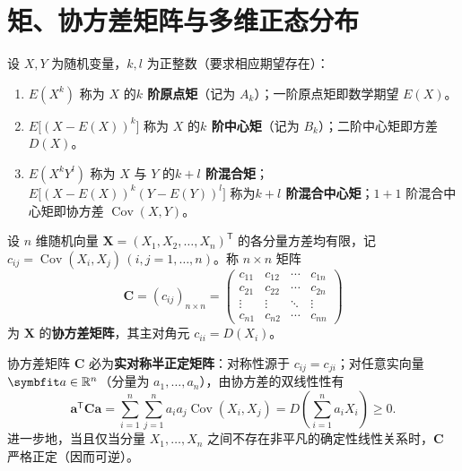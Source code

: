 \section{矩、协方差矩阵与多维正态分布}
\label{sec:moments}

\begin{definition}
\label{def:moments}
设 $X,Y$ 为随机变量，$k,l$ 为正整数（要求相应期望存在）：
\begin{enumerate}
  \item $E(X^k)$ 称为 $X$ 的\textbf{$k$ 阶原点矩}（记为 $A_k$）；一阶原点矩即数学期望 $E(X)$。
  \item $E\bigl[(X-E(X))^k\bigr]$ 称为 $X$ 的\textbf{$k$ 阶中心矩}（记为 $B_k$）；二阶中心矩即方差 $D(X)$。
  \item $E(X^k Y^l)$ 称为 $X$ 与 $Y$ 的\textbf{$k+l$ 阶混合矩}；$E\bigl[(X-E(X))^k(Y-E(Y))^l\bigr]$ 称为\textbf{$k+l$ 阶混合中心矩}；$1+1$ 阶混合中心矩即协方差 $\operatorname{Cov}(X,Y)$。
\end{enumerate}
\end{definition}

\begin{definition}[协方差矩阵]
\label{def:covariance-matrix}
设 $n$ 维随机向量 $\bm{X}=(X_1,X_2,\ldots,X_n)^{\mathsf{T}}$ 的各分量方差均有限，记 $c_{ij}=\operatorname{Cov}(X_i,X_j)\,(i,j=1,\ldots,n)$。称 $n\times n$ 矩阵
\begin{equation}
  \bm{C}=(c_{ij})_{n\times n}=
  \begin{pmatrix}
    c_{11} & c_{12} & \cdots & c_{1n} \\
    c_{21} & c_{22} & \cdots & c_{2n} \\
    \vdots & \vdots & \ddots & \vdots \\
    c_{n1} & c_{n2} & \cdots & c_{nn}
  \end{pmatrix}
  \label{eq:cov-matrix}
\end{equation}
为 $\bm{X}$ 的\textbf{协方差矩阵}，其主对角元 $c_{ii}=D(X_i)$。
\end{definition}

协方差矩阵 $\bm{C}$ 必为\textbf{实对称半正定矩阵}：对称性源于 $c_{ij}=c_{ji}$；对任意实向量 $\bm{a}\in\R^n$（分量为 $a_1,\ldots,a_n$），由协方差的双线性性有
\[
  \bm{a}^{\mathsf{T}}\bm{C}\bm{a}
  =\sum_{i=1}^{n}\sum_{j=1}^{n}a_i a_j \operatorname{Cov}(X_i,X_j)
  =D\!\left(\sum_{i=1}^{n}a_i X_i\right)\ge 0.
\]
进一步地，当且仅当分量 $X_1,\ldots,X_n$ 之间不存在非平凡的确定性线性关系时，$\bm{C}$ 严格正定（因而可逆）。

